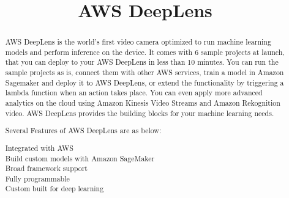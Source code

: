 \documentclass{article}
\begin{document}
\title{AWS DeepLens}
\maketitle
\begin{abstract}

AWS DeepLens is the world's first video camera optimized to run machine learning models and perform inference on the device. It comes with 6 sample projects at launch, that you can deploy to your AWS DeepLens in less than 10 minutes. You can run the sample projects as is, connect them with other AWS services, train a model in Amazon Sagemaker and deploy it to AWS DeepLens, or extend the functionality by triggering a lambda function when an action takes place. You can even apply more advanced analytics on the cloud using Amazon Kinesis Video Streams and Amazon Rekognition video. AWS DeepLens provides the building blocks for your machine learning needs.\cite{ref:deeplens}\hfill\break

Several Features of AWS DeepLens are as below: \\

\begin{description}
	\item[Integrated with AWS]
	\item[Build custom models with Amazon SageMaker]
	\item[Broad framework support]
	\item[Fully programmable]
	\item[Custom built for deep learning]
	
\end{description} 


	
	
\end{abstract}	
\end{document}
